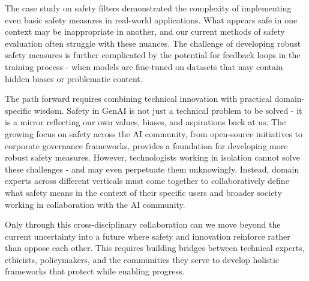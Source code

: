 The case study on safety filters demonstrated the complexity of implementing even basic safety measures in real-world applications. What appears safe in one context may be inappropriate in another, and our current methods of safety evaluation often struggle with these nuances. The challenge of developing robust safety measures is further complicated by the potential for feedback loops in the training process - when models are fine-tuned on datasets that may contain hidden biases or problematic content.

The path forward requires combining technical innovation with practical domain-specific wisdom. Safety in GenAI is not just a technical problem to be solved - it is a mirror reflecting our own values, biases, and aspirations back at us. The growing focus on safety across the AI community, from open-source initiatives to corporate governance frameworks, provides a foundation for developing more robust safety measures. However, technologists working in isolation cannot solve these challenges - and may even perpetuate them unknowingly. Instead, domain experts across different verticals must come together to collaboratively define what safety means in the context of their specific users and broader society working in collaboration with the AI community.

Only through this cross-disciplinary collaboration can we move beyond the current uncertainty into a future where safety and innovation reinforce rather than oppose each other. This requires building bridges between technical experts, ethicists, policymakers, and the communities they serve to develop holistic frameworks that protect while enabling progress.
